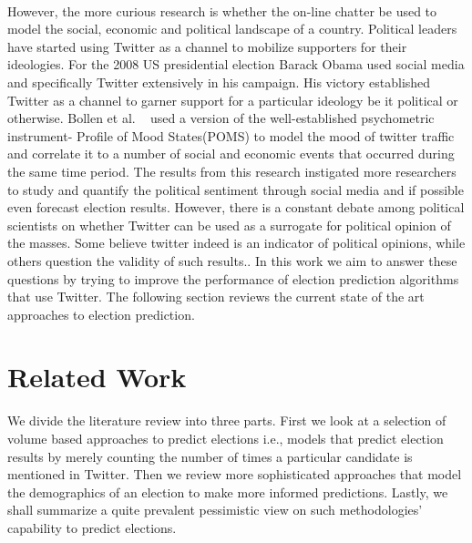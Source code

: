 \paragraph{}
However, the more curious research is whether the on-line chatter be used to model the social, economic and political landscape of a country.
Political leaders have started using Twitter as a channel to mobilize supporters for their ideologies.
For the 2008 US presidential election Barack Obama used social media and specifically Twitter extensively in his campaign. 
His victory established Twitter as a channel to garner support for a particular ideology be it political or otherwise.
Bollen et al. ~\cite{bollen2011modeling} used a version of the well-established psychometric instrument- Profile of Mood States(POMS) to model the mood of twitter traffic and correlate it to a number of social and economic events that occurred during the same time period. 
The results from this research instigated more researchers to study and quantify the political sentiment through social media and if possible even forecast election results.
However, there is a constant debate among political scientists on whether Twitter can be used as a surrogate for political opinion of the masses.
Some believe twitter indeed is an indicator of political opinions, while others question the validity of such results.. 
In this work we aim to answer these questions by trying to improve the performance of election prediction algorithms that use Twitter.
The following section reviews the current state of the art approaches to election prediction. 

\section{Related Work}
We divide the literature review into three parts.
First we look at a selection of volume based approaches to predict elections i.e., models that predict election results by merely counting the number of times a particular candidate is mentioned in Twitter.
Then we review more sophisticated approaches that model the demographics of an election to make more informed predictions.
Lastly, we shall summarize a quite prevalent pessimistic view on such methodologies' capability to predict elections.
